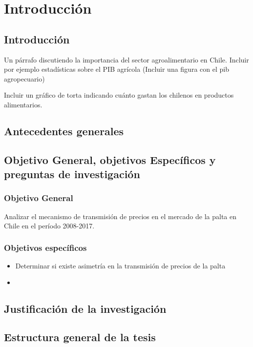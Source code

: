 \chapter{Introducción}

\section{Introducción}

Un párrafo discutiendo la importancia del sector agroalimentario en Chile. Incluir por ejemplo estadísticas sobre el PIB agrícola (Incluir una figura con el pib agropecuario)

Incluir un gráfico de torta indicando cuánto gastan los chilenos en productos alimentarios. 

\section{Antecedentes generales}

\section{Objetivo General, objetivos Específicos y preguntas de investigación}
\subsection{Objetivo General}

Analizar el mecanismo de transmisión de precios en el mercado de la palta en Chile en el período 2008-2017. 

\subsection{Objetivos específicos}
\begin{itemize}
\item Determinar si existe asimetría en la transmisión de precios de la palta
\item 
\end{itemize}

\section{Justificación de la investigación}

\section{Estructura general de la tesis}